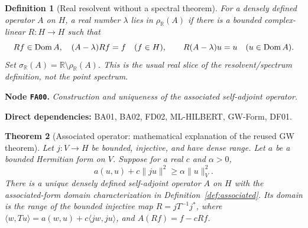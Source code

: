 \documentclass[11pt,a4paper]{article}
\newtheorem{theorem}{Theorem}[section]
\newtheorem{definition}[theorem]{Definition}
\theoremstyle{remark}\newtheorem{remark}[theorem]{Remark}
\newcommand{\R}{\mathbb R}\newcommand{\C}{\mathbb C}\newcommand{\N}{\mathbb N}
\newcommand{\node}[3]{\par\Needspace{6\baselineskip}\smallskip\hypertarget{node:#1}{}\label{nodepage:#1}\noindent\textbf{Node \texttt{#1}.} \textit{#2.}\par\noindent\textbf{Direct dependencies:} #3.\par}
\newcommand{\sigR}{\sigma_{\R}}
\newcommand{\resR}{\rho_{\R}}
\begin{document}
\begin{definition}[Real resolvent without a spectral theorem]\label{def:resolvent}
For a densely defined operator $A$ on $H$, a real number $\lambda$ lies in $\resR(A)$ if there is a bounded complex-linear $R:H\to H$ such that
\[
 Rf\in\operatorname{Dom} A,\quad (A-\lambda)Rf=f\quad(f\in H),
 \qquad R(A-\lambda)u=u\quad(u\in\operatorname{Dom} A).
\]
Set $\sigR(A)=\R\setminus\resR(A)$. This is the usual real slice of the resolvent/spectrum definition, not the point spectrum.
\end{definition}

\node{FA00}{Construction and uniqueness of the associated self-adjoint operator}{BA01, BA02, FD02, ML-HILBERT, GW-Form, DF01}
\begin{theorem}[Associated operator: mathematical explanation of the reused GW theorem]\label{thm:associatedconstruction}
Let $j:V\to H$ be bounded, injective, and have dense range. Let $a$ be a bounded Hermitian form on $V$. Suppose for a real $c$ and $\alpha>0$,
\[
 a(u,u)+c\|ju\|^2\geq\alpha\|u\|_V^2.
\]
There is a unique densely defined self-adjoint operator $A$ on $H$ with the associated-form domain characterization in Definition~\ref{def:associated}. Its domain is the range of the bounded injective map
$R=jT^{-1}j^*$, where $\langle w,Tu\rangle=a(w,u)+c\langle jw,ju\rangle$, and
$A(Rf)=f-cRf$.
\end{theorem}
\end{document}

